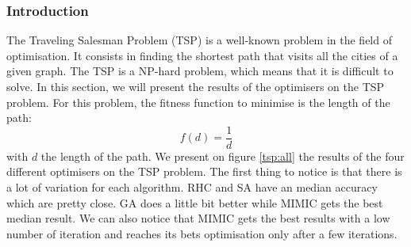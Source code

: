 \documentclass[twocolumn, 10pt]{article}
\begin{document}
			\subsubsection*{Introduction}
				The Traveling Salesman Problem (TSP) is a well-known problem in the field of optimisation. It consists in finding the shortest path that visits all the cities of a given graph. The TSP is a NP-hard problem, which means that it is difficult to solve. In this section, we will present the results of the optimisers on the TSP problem.
				For this problem, the fitness function to minimise is the length of the path:
				\begin{equation}
					f(d) = \frac{1}{d}
				\end{equation}
				with $d$ the length of the path.
				We present on figure \ref{tsp:all} the results of the four different optimisers on the TSP problem. The first thing to notice is that there is a lot of variation for each algorithm. RHC and SA have an median accuracy which are pretty close. GA does a little bit better while MIMIC gets the best median result. We can also notice that MIMIC gets the best results with a low number of iteration and reaches its bets optimisation only after a few iterations.
\end{document}
